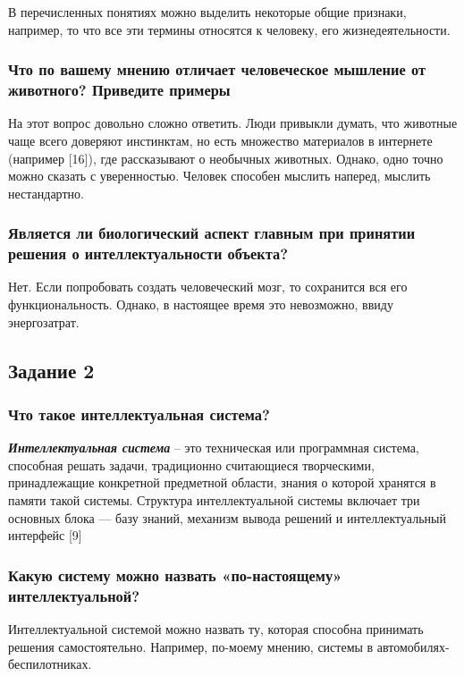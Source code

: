 \documentclass[14pt,a4paper,report]{report}
\begin{document}
В перечисленных понятиях можно выделить некоторые общие признаки, например, то что все эти термины относятся к человеку, его жизнедеятельности. 

\subsubsection{Что по вашему мнению отличает человеческое мышление от животного? Приведите примеры}

На этот вопрос довольно сложно ответить. Люди привыкли думать, что животные чаще всего доверяют инстинктам, но есть множество материалов в интернете (например [16]), где рассказывают о необычных животных. Однако, одно точно можно сказать с уверенностью. Человек способен мыслить наперед, мыслить нестандартно.

\subsubsection{Является ли биологический аспект главным при принятии решения о интеллектуальности объекта?}

Нет. Если попробовать создать человеческий мозг, то сохранится вся его функциональность. Однако, в настоящее время это невозможно, ввиду энергозатрат.

\subsection{Задание 2}

\subsubsection{Что такое интеллектуальная система?}

\emph{\textbf{Интеллектуальная система}} -- это техническая или программная система, способная решать задачи, традиционно считающиеся творческими, принадлежащие конкретной предметной области, знания о которой хранятся в памяти такой системы. Структура интеллектуальной системы включает три основных блока — базу знаний, механизм вывода решений и интеллектуальный интерфейс [9] 

\subsubsection{Какую систему можно назвать «по-настоящему» интеллектуальной?}

Интеллектуальной системой можно назвать ту, которая способна принимать решения самостоятельно. Например, по-моему мнению, системы в автомобилях-беспилотниках.
\end{document}
